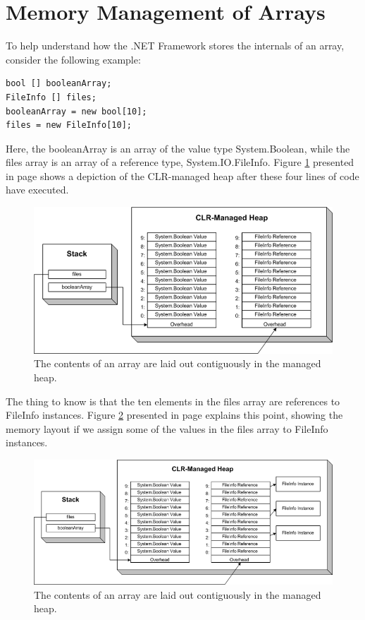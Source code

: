 \documentclass[12pt,a4paper,final,twoside,titlepage]{book}
\begin{document}
\section{Memory Management of Arrays}
To help understand how the .NET Framework stores the internals of an array, consider the following example:
\begin{lstlisting}
bool [] booleanArray;
FileInfo [] files;
booleanArray = new bool[10];
files = new FileInfo[10];
\end{lstlisting}
Here, the booleanArray is an array of the value type System.Boolean, while the files array is an array of a reference type, System.IO.FileInfo. Figure \ref{CLR-Value} presented in page \pageref{CLR-Value} shows a depiction of the CLR-managed heap after these four lines of code have executed.
\begin{figure}
\begin{center}
\includegraphics[scale=0.5]{CLR-Value}
\caption{The contents of an array are laid out contiguously in the managed heap.}
\label{CLR-Value}
\end{center}
\end{figure}
The thing to know is that the ten elements in the files array are references to FileInfo instances. Figure  \ref{CLR-Value2} presented in page \pageref{CLR-Value2} explains this point, showing the memory layout if we assign some of the values in the files array to FileInfo instances.
\begin{figure}
\begin{center}
\includegraphics[scale=0.5]{CLR-Value2}
\caption{The contents of an array are laid out contiguously in the managed heap.}
\label{CLR-Value2}
\end{center}
\end{figure}
\end{document}
